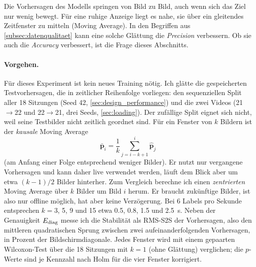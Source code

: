 Die Vorhersagen des Modells springen von Bild zu Bild, auch wenn sich das Ziel
nur wenig bewegt. Für eine ruhige Anzeige liegt es nahe, sie über ein
gleitendes Zeitfenster zu mitteln (Moving Average). In den Begriffen aus
\cref{subsec:datenqualitaet} kann eine solche Glättung die \emph{Precision} verbessern.
Ob sie auch die \emph{Accuracy} verbessert, ist die Frage dieses Abschnitts.

\paragraph{Vorgehen.} Für dieses Experiment ist kein neues Training nötig. Ich
glätte die gespeicherten Testvorhersagen, die in zeitlicher Reihenfolge
vorliegen: den sequenziellen Split aller 18 Sitzungen (Seed 42,
\cref{sec:design_performance}) und die zwei Videos (21$\to$22 und 22$\to$21,
drei Seeds, \cref{sec:loading}). Der zufällige Split eignet sich nicht, weil
seine Testbilder nicht zeitlich geordnet sind. Für ein Fenster von $k$ Bildern
ist der \emph{kausale} Moving Average
\begin{equation}
  \bar{\bm p}_i = \frac{1}{k}\sum_{j=i-k+1}^{i}\hat{\bm p}_j
  \label{eq:ma}
\end{equation}
(am Anfang einer Folge entsprechend weniger Bilder). Er nutzt nur vergangene
Vorhersagen und kann daher live verwendet werden, läuft dem Blick aber um etwa
$(k-1)/2$ Bilder hinterher. Zum Vergleich berechne ich einen \emph{zentrierten}
Moving Average über $k$ Bilder um Bild $i$ herum. Er braucht zukünftige Bilder,
ist also nur offline möglich, hat aber keine Verzögerung. Bei 6 Labels pro
Sekunde entsprechen $k=3$, 5, 9 und 15 etwa \SI{0,5}{}, \SI{0,8}{}, \SI{1,5}{}
und \SI{2,5}{\second}. Neben der Genauigkeit $E_{\mathrm{diag}}$ messe ich die Stabilität
als RMS-S2S der Vorhersagen, also den mittleren quadratischen Sprung zwischen
zwei aufeinanderfolgenden Vorhersagen, in Prozent der Bildschirmdiagonale.
Jedes Fenster wird mit einem gepaarten Wilcoxon-Test über die 18 Sitzungen mit
$k=1$ (ohne Glättung) verglichen; die $p$-Werte sind je Kennzahl nach Holm für
die vier Fenster korrigiert.

